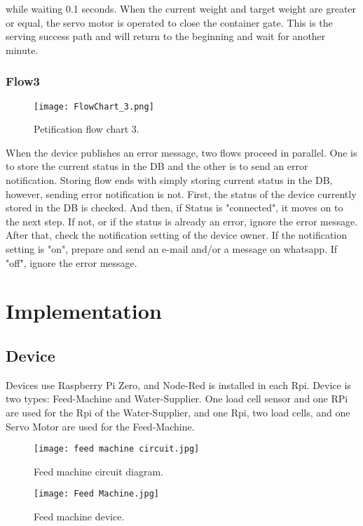 \documentclass[conference]{IEEEtran}
\begin{document}
while waiting 0.1 seconds. When the current weight and target weight are greater or equal, the servo motor is operated to close the container gate. This is the serving success path and will return to the beginning and wait for another minute.

\hfill \break
\subsubsection{Flow3}
\begin{figure}[htbp]
\centerline{\texttt{[image: FlowChart\_3.png]}}
\caption{Petification flow chart 3.}
\label{fig}
\end{figure}
When the device publishes an error message, two flows proceed in parallel. One is to store the current status in the DB and the other is to send an error notification.
Storing flow ends with simply storing current status in the DB, however, sending error notification is not.
First, the status of the device currently stored in the DB is checked. And then, if Status is "connected", it moves on to the next step. If not, or if the status is already an error, ignore the error message. After that, check the notification setting of the device owner. If the notification setting is "on", prepare and send an e-mail and/or a message on whatsapp. If "off", ignore the error message. 

\section{Implementation}
\subsection{Device}%

Devices use Raspberry Pi Zero, and Node-Red is installed in each Rpi. Device is two types: Feed-Machine and Water-Supplier.
One load cell sensor and one RPi are used for the Rpi of the Water-Supplier, and one Rpi, two load cells, and one Servo Motor are used for the Feed-Machine.
\begin{figure}[htbp]
\centerline{\texttt{[image: feed machine circuit.jpg]}}
\caption{Feed machine circuit diagram.}
\label{fig}
\end{figure}

\begin{figure}[htbp]
\centerline{\texttt{[image: Feed Machine.jpg]}}
\caption{Feed machine device.}
\label{fig}
\end{figure}
\end{document}
